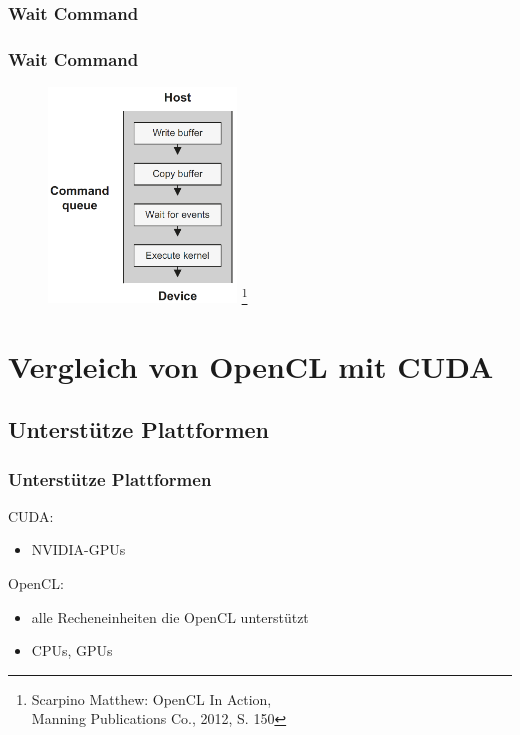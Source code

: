 \documentclass{beamer}
\begin{document}
\subsubsection*{Wait Command}
\begin{frame}
\frametitle{Wait Command}
\begin{figure}
\begin{center}
\includegraphics[width=5cm]{wait_command_p150.PNG}
\footnote{\tiny{Scarpino Matthew: OpenCL In Action, \\Manning Publications Co., 2012, S. 150}}
\end{center}
\end{figure}
\end{frame}

\section{Vergleich von OpenCL mit CUDA}

\subsection{Unterstütze Plattformen}
\begin{frame}
\frametitle{Unterstütze Plattformen}
CUDA:
\begin{itemize}
\item NVIDIA-GPUs
\newline
\end{itemize}
OpenCL:
\begin{itemize}
\item alle Recheneinheiten die OpenCL unterstützt
\item CPUs, GPUs
\end{itemize}
\end{frame}
\end{document}
